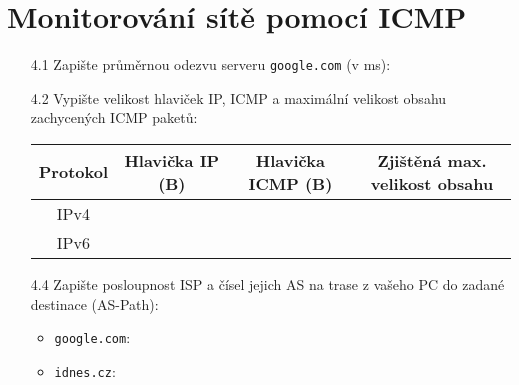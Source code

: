 \documentclass[a4paper,11pt]{article}
\begin{document}
\section{Monitorování sítě pomocí ICMP}
\begin{itemize}
  \item [4.1] Zapište průměrnou odezvu serveru \texttt{google.com} (v ms):
  \item [4.2] Vypište velikost hlaviček IP, ICMP a maximální velikost obsahu zachycených ICMP paketů:

    \vspace{2mm}
    \begin{tabular}{|c|c|c|c|}  \hline
     Protokol  & Hlavička IP (B)  & Hlavička ICMP (B)  & Zjištěná max. velikost obsahu \\ \hline
     IPv4      &     &       &      \\   \hline
     IPv6      &     &       &      \\  \hline
\end{tabular}

    \vspace{2mm}
    \item [4.4] Zapište posloupnost ISP a čísel jejich AS na trase z vašeho PC do zadané destinace (AS-Path):
        \begin{itemize}
            \item \texttt{google.com}:
            \vspace{3cm}
            \item \texttt{idnes.cz}:
            \vspace{3cm}
        \end{itemize}
\end{itemize}
\end{document}
